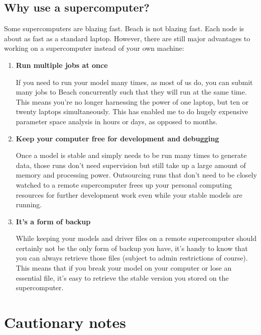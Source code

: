 \documentclass[12pt, oneside]{article}   	%
\begin{document}
\subsection{Why use a supercomputer?}
Some supercomputers are blazing fast. Beach is not blazing fast. Each node is about as fast as a standard laptop. However, there are still major advantages to working on a supercomputer instead of your own machine:
\begin{enumerate}
\item \textbf{Run multiple jobs at once}\par
If you need to run your model many times, as most of us do, you can submit many jobs to Beach concurrently such that they will run at the same time. This means you're no longer harnessing the power of one laptop, but ten or twenty laptops simultaneously. This has enabled me to do hugely expensive parameter space analysis in hours or days, as opposed to months.
\item \textbf{Keep your computer free for development and debugging}\par
Once a model is stable and simply needs to be run many times to generate data, those runs don't need supervision but still take up a large amount of memory and processing power. Outsourcing runs that don't need to be closely watched to a remote supercomputer frees up your personal computing resources for further development work even while your stable models are running.
\item \textbf{It's a form of backup}\par
While keeping your models and driver files on a remote supercomputer should certainly not be the only form of backup you have, it's handy to know that you can always retrieve those files (subject to admin restrictions of course). This means that if you break your model on your computer or lose an essential file, it's easy to retrieve the stable version you stored on the supercomputer.
\end{enumerate}

\section{Cautionary notes}
\end{document}
